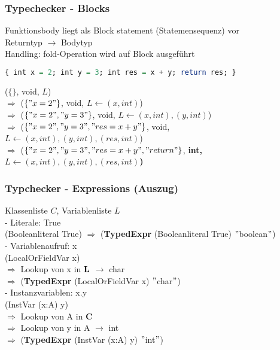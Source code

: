 \begin{frame}[fragile]
    \frametitle{Typechecker - Blocks}
Funktionsbody liegt als Block statement (Statemensequenz) vor \\
Returntyp $\rightarrow$ Bodytyp \\
\pause
Handling: fold-Operation wird auf Block ausgeführt
\begin{lstlisting}[language=Haskell]
{ int x = 2; int y = 3; int res = x + y; return res; }	
\end{lstlisting}
\pause
($\{ \}$, void, $L$) \\
\pause
$\Rightarrow$ ($\{"x=2"\}$, void, $L \leftarrow (x,int)$) \\
\pause
$\Rightarrow$ ($\{"x=2","y=3"\}$, void, $L \leftarrow (x,int),(y,int)$) \\
\pause
$\Rightarrow$ ($\{"x=2","y=3","res=x+y"\}$, void, $L \leftarrow (x,int),(y,int),(res,int)$) \\
\pause
$\Rightarrow$ ($\{"x=2","y=3","res=x+y","return"\}$, \bf{int}, $L \leftarrow (x,int),(y,int),(res,int)$) \\
\end{frame}

\begin{frame}
    \frametitle{Typchecker - Expressions (Auszug)}
Klassenliste $C$, Variablenliste $L$ \\
- Literale: True\\
(Booleanliteral True) $\Rightarrow$ ({\bf TypedExpr} (Booleanliteral True) $"$boolean$"$) \\
\pause
- Variablenaufruf: x \\
(LocalOrFieldVar x) \\
$\Rightarrow$ Lookup von x in ${\bf L}$ $\rightarrow$ char \\
$\Rightarrow$ ({\bf TypedExpr} (LocalOrFieldVar x) $"$char$"$) \\
\pause
- Instanzvariablen: x.y \\
(InstVar (x:A) y) \\
$\Rightarrow$ Lookup von A in {\bf C} \\ 
$\Rightarrow$ Lookup von y in A $\rightarrow$ int \\
$\Rightarrow$  ({\bf TypedExpr} (InstVar (x:A) y) $"$int$"$)
 
\end{frame}

